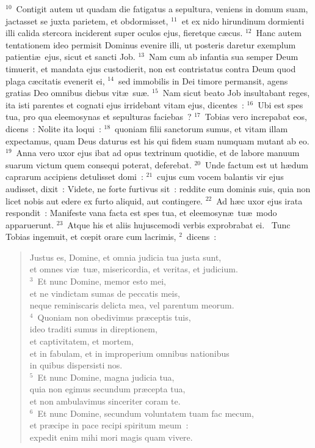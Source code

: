${}^{10}$~Contigit autem ut quadam die fatigatus a sepultura, veniens in domum suam, jactasset se juxta parietem, et obdormisset,
${}^{11}$~et ex nido hirundinum dormienti illi calida stercora inciderent super oculos ejus, fieretque c\ae cus.
${}^{12}$~Hanc autem tentationem ideo permisit Dominus evenire illi, ut posteris daretur exemplum patienti\ae\ ejus, sicut et sancti Job.
${}^{13}$~Nam cum ab infantia sua semper Deum timuerit, et mandata ejus custodierit, non est contristatus contra Deum quod plaga c\ae citatis evenerit ei,
${}^{14}$~sed immobilis in Dei timore permansit, agens gratias Deo omnibus diebus vit\ae\ su\ae .
${}^{15}$~Nam sicut beato Job insultabant reges, ita isti parentes et cognati ejus irridebant vitam ejus, dicentes~:
${}^{16}$~Ubi est spes tua, pro qua eleemosynas et sepulturas faciebas~?
${}^{17}$~Tobias vero increpabat eos, dicens~: Nolite ita loqui~:
${}^{18}$~quoniam filii sanctorum sumus, et vitam illam expectamus, quam Deus daturus est his qui fidem suam numquam mutant ab eo.
${}^{19}$~Anna vero uxor ejus ibat ad opus textrinum quotidie, et de labore manuum suarum victum quem consequi poterat, deferebat.
${}^{20}$~Unde factum est ut h\ae dum caprarum accipiens detulisset domi~:
${}^{21}$~cujus cum vocem balantis vir ejus audisset, dixit~: Videte, ne forte furtivus sit~: reddite eum dominis suis, quia non licet nobis aut edere ex furto aliquid, aut contingere.
${}^{22}$~Ad h\ae c uxor ejus irata respondit~: Manifeste vana facta est spes tua, et eleemosyn\ae\ tu\ae\ modo apparuerunt.
${}^{23}$~Atque his et aliis hujuscemodi verbis exprobrabat ei.
~Tunc Tobias ingemuit, et cœpit orare cum lacrimis,
${}^{2}$~dicens~: \begin{flushleft}\begin{verse}Justus es, Domine, et omnia judicia tua justa sunt,\\ et omnes vi\ae\ tu\ae , misericordia, et veritas, et judicium.\\
${}^{3}$~Et nunc Domine, memor esto mei,\\ et ne vindictam sumas de peccatis meis,\\ neque reminiscaris delicta mea, vel parentum meorum.\\
${}^{4}$~Quoniam non obedivimus pr\ae ceptis tuis,\\ ideo traditi sumus in direptionem,\\ et captivitatem, et mortem,\\ et in fabulam, et in improperium omnibus nationibus\\ in quibus dispersisti nos.\\
${}^{5}$~Et nunc Domine, magna judicia tua,\\ quia non egimus secundum pr\ae cepta tua,\\ et non ambulavimus sinceriter coram te.\\
${}^{6}$~Et nunc Domine, secundum voluntatem tuam fac mecum,\\ et pr\ae cipe in pace recipi spiritum meum~:\\ expedit enim mihi mori magis quam vivere.\end{verse}\end{flushleft}


